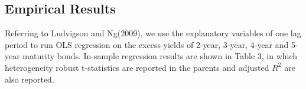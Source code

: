 \documentclass[12pt]{article}
\begin{document}
\begin{table}[htp!]
    \centering
    \caption{Summary Statistics}
\end{table}

\subsection{Empirical Results}
Referring to Ludvigson and Ng(2009)\cite{ludvigson2009macro}, we use the explanatory variables of one lag period to run OLS regression on the excess yields of 2-year, 3-year, 4-year and 5-year maturity bonds. In-sample regression results are shown in Table 3, in which heterogeneity robust t-statistics are reported in the parents and adjusted $R^2$ are also reported.

\newpage
\end{document}
